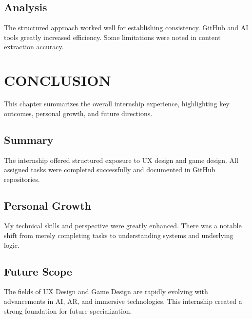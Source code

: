 \documentclass[12pt,a4paper]{report}
\begin{document}
\section{Analysis}

The structured approach worked well for establishing consistency. GitHub and AI tools greatly increased efficiency. Some limitations were noted in content extraction accuracy.




\chapter{CONCLUSION}


This chapter summarizes the overall internship experience, highlighting key outcomes, personal growth, and future directions.




\section{Summary}

The internship offered structured exposure to UX design and game design. All assigned tasks were completed successfully and documented in GitHub repositories.


\section{Personal Growth}

My technical skills and perspective were greatly enhanced. There was a notable shift from merely completing tasks to understanding systems and underlying logic.


\section{Future Scope}

The fields of UX Design and Game Design are rapidly evolving with advancements in AI, AR, and immersive technologies. This internship created a strong foundation for future specialization.
\end{document}
